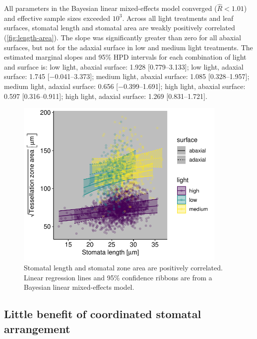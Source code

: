 \documentclass[webpdf,large,modern,unnumsec,namedate]{oup-authoring-template}
\begin{document}
All parameters in the Bayesian linear mixed-effects model converged
(\(\hat{R} < 1.01\)) and effective sample sizes exceeded \(10^3\).
Across all light treatments and leaf surfaces, stomatal length and
stomatal area are weakly positively correlated
(\autoref{fig:length-area}). The slope was significantly greater than
zero for all abaxial surfaces, but not for the adaxial surface in low
and medium light treatments. The estimated marginal slopes and 95\% HPD
intervals for each combination of light and surface is: low light,
abaxial surface: 1.928 {[}\numrange{0.779}{3.133}{]}; low light, adaxial
surface: 1.745 {[}\numrange{-0.041}{3.373}{]}; medium light, abaxial
surface: 1.085 {[}\numrange{0.328}{1.957}{]}; medium light, adaxial
surface: 0.656 {[}\numrange{-0.399}{1.691}{]}; high light, abaxial
surface: 0.597 {[}\numrange{0.316}{0.911}{]}; high light, adaxial
surface: 1.269 {[}\numrange{0.831}{1.721}{]}.

\begin{figure}[ht]
\includegraphics[width = 4in]{figures/length-area.pdf}
\caption{Stomatal length and stomatal zone area are positively correlated. Linear regression lines and 95\% confidence ribbons are from a Bayesian linear mixed-effects model.}
\label{fig:length-area}
\end{figure}

\subsection{Little benefit of coordinated stomatal
arrangement}\label{little-benefit-of-coordinated-stomatal-arrangement}
\end{document}
